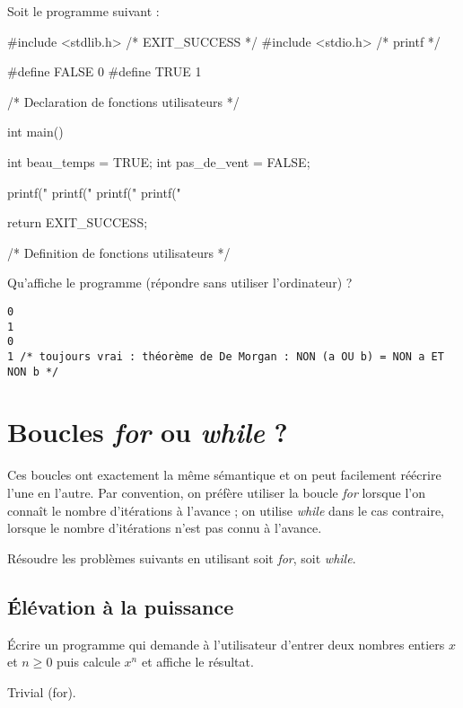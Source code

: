 Soit le programme suivant :
{\small
\begin{listing}{1}
#include <stdlib.h> /* EXIT_SUCCESS */
#include <stdio.h> /* printf */

#define FALSE 0
#define TRUE 1

/* Declaration de fonctions utilisateurs */

int main()
{
    int beau_temps = TRUE;
    int pas_de_vent = FALSE;

    printf("%
    printf("%
    printf("%
    printf("%

    return EXIT_SUCCESS;
}

/* Definition de fonctions utilisateurs */
\end{listing}
}

Qu'affiche le programme (répondre sans utiliser l'ordinateur) ?
  \begin{correction}
\begin{verbatim}
0
1
0
1 /* toujours vrai : théorème de De Morgan : NON (a OU b) = NON a ET NON b */
\end{verbatim}
  \end{correction}



\section{Boucles \textit{for} ou \textit{while} ?}

Ces boucles ont exactement la même sémantique et on peut facilement
réécrire l'une en l'autre. Par convention, on préfère utiliser la
boucle \textit{for} lorsque l'on connaît le nombre d'itérations à
l'avance ; on utilise \textit{while} dans le cas contraire, lorsque le nombre
d'itérations n'est pas connu à l'avance. 

Résoudre les problèmes suivants en utilisant soit \textit{for}, soit \textit{while}.

\subsection{Élévation à la puissance}

Écrire un programme qui demande à l'utilisateur d'entrer deux nombres
entiers $x$ et $n \geq 0$ puis calcule $x^n$ et affiche le résultat.
\begin{correction}
Trivial (for).
\end{correction}

